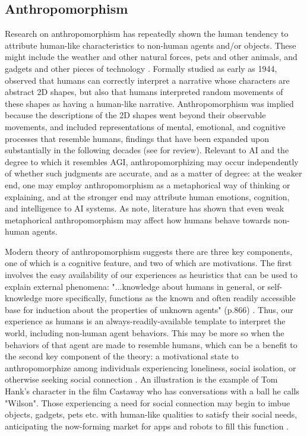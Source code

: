 \documentclass{article}
\theoremstyle{plain}
\theoremstyle{definition}
\theoremstyle{remark}
\begin{document}
\subsection{Anthropomorphism}

Research on anthropomorphism has repeatedly shown the human tendency to attribute human-like characteristics to non-human agents and/or objects. These might include the weather and other natural forces, pets and other animals, and gadgets and other pieces of technology \cite{epley2007seeing}. Formally studied as early as 1944, \cite{heider1944experimental} observed that humans can correctly interpret a narrative whose characters are abstract 2D shapes, but also that humans interpreted random movements of these shapes as having a human-like narrative. Anthropomorphism was implied because the descriptions of the 2D shapes went beyond their observable movements, and included representations of mental, emotional, and cognitive processes that resemble humans, findings that have been expanded upon substantially in the following decades (see \cite{epley2007seeing} for review). 
Relevant to AI and the degree to which it resembles AGI, anthropomorphizing may occur independently of whether such judgments are accurate, and as a matter of degree: at the weaker end, one may employ anthropomorphism as a metaphorical way of thinking or explaining, and at the stronger end may attribute human emotions, cognition, and intelligence to AI systems. As \cite{epley2007seeing} note, literature has shown that even weak metaphorical anthropomorphism may affect how humans behave towards non-human agents.

Modern theory of anthropomorphism suggests there are three key components, one of which is a cognitive feature, and two of which are motivations. The first involves the easy availability of our experiences as heuristics that can be used to explain external phenomena: "...knowledge about humans in general, or self-knowledge more specifically, functions as the known and often readily accessible base for induction about the properties of unknown agents" (p.866) \cite{epley2007seeing, waytz2010social}. Thus, our experience as humans is an always-readily-available template to interpret the world, including non-human agent behaviors. This may be more so when the behaviors of that agent are made to resemble humans, which can be a benefit to the second key component of the theory: a motivational state to anthropomorphize among individuals experiencing loneliness, social isolation, or otherwise seeking social connection \cite{epley2007seeing, waytz2010social}. An illustration is the example of Tom Hank's character in the film Castaway who has conversations with a ball he calls "Wilson". Those experiencing a need for social connection may begin to imbue objects, gadgets, pets etc. with human-like qualities to satisfy their social needs, anticipating the now-forming market for apps and robots to fill this function \cite{salles2020anthropomorphism}. 
\end{document}
